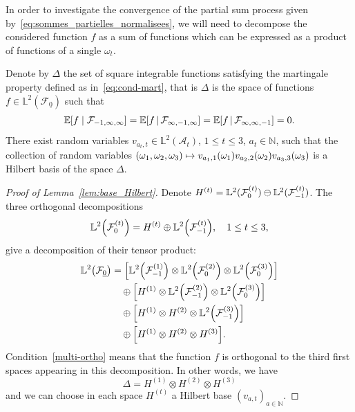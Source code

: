 \documentclass[AHL,Unicode,longabstracts,published]{cedram}
\newcommand*\N{\mathbb{N}}
\newcommand*\bbL{\mathbb{L}}
\newcommand{\bbE}{\mathbb{E}}
\newcommand{\E}[1]{\bbE\left[#1\right]}
\newcommand*\A{\mathcal{A}}
\newcommand{\Fca}{\mathcal{F}}
\newcommand{\pr}[1]{\left(#1\right)}
\let\originalleft\left
\let\originalright\right
\renewcommand{\left}{\mathopen{}\mathclose\bgroup\originalleft}
\renewcommand{\right}{\aftergroup\egroup\originalright}
\begin{document}
In order to investigate the convergence of the partial sum process given by~\eqref{eq:sommes_partielles_normalisees}, we will need to decompose the considered function $f$ as a sum of functions which can be expressed as a product of functions of a single $\omega_t$.
\begin{lemm}\label{lem:base_Hilbert}
Denote by $\Delta$ the set of square integrable functions satisfying the martingale property defined as in~\eqref{eq:cond-mart}, {that is $\Delta$ is the space of functions $f\in \bbL^2(\Fca_{\underline0})$ such that
\begin{equation}\label{multi-ortho}
\E{f\mid\Fca_{-1,\infty,\infty}}=\E{f\,\middle|\,\Fca_{\infty,-1,\infty}}=\E{f\,\middle|\,\Fca_{\infty,\infty,-1}}=0.
\end{equation}
There exist random variables $v_{a_t,t}\in \bbL^2(\A_t)$, $1\leq t\leq 3$, $a_t\in\N$, such that the collection of random variables $(\omega_1,\omega_2,\omega_3)\mapsto v_{a_1,1}\pr{\omega_1}v_{a_2,2}\pr{\omega_2} v_{a_3,3}\pr{\omega_3}$ is a Hilbert basis of the space $\Delta$.}
\end{lemm}
\begin{proof}[Proof of Lemma~\ref{lem:base_Hilbert}]
Denote $H^{(t)}=\bbL^2(\Fca_{0}^{\pr{t}})\ominus
\bbL^2(\Fca_{-1}^{\pr{t}})$.
The three orthogonal decompositions
\[
\bbL^2\pr{\Fca_{0}^{\pr{t}}}=H^{(t)} \oplus \bbL^2\left(\Fca_{-1}^{\pr{t}}\right), \quad 1\leq t\leq 3,
\]
give a decomposition of their tensor product:
\begin{align*}
\bbL^2\left(\Fca_{\underline0}\right)&=\left[\bbL^2\pr{\Fca_{-1}^{\pr{1}}} \otimes \bbL^2\pr{\Fca_{0}^{\pr{2}}}\otimes \bbL^2\pr{\Fca_{0}^{\pr{3}}}\right]\\
&\quad\oplus\left[H^{(1)}\otimes \bbL^2\pr{\Fca_{-1}^{\pr{2}}}\otimes\bbL^2\pr{\Fca_{0}^{\pr{3}}}\right]\\
&\quad\oplus \left[H^{(1)}\otimes H^{(2)}\otimes \bbL^2\pr{\Fca_{-1}^{\pr{3}}}\right]\\
&\quad\oplus\left[H^{(1)}\otimes H^{(2)}\otimes H^{(3)}\right].
\end{align*}
Condition~\eqref{multi-ortho} means that the function $f$ is orthogonal to the third first spaces appearing in this decomposition. In other words, we have
\[
\Delta=H^{(1)}\otimes H^{(2)}\otimes H^{(3)}
\]
and we can choose in each space $H^{(t)}$ a Hilbert base $(v_{a,t})_{a\in\N}$.
\end{proof}
\end{document}

